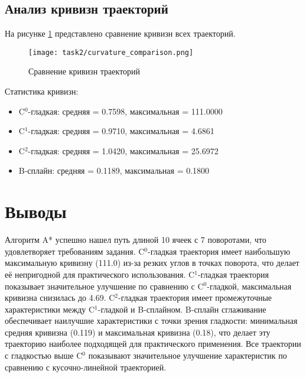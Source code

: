 \subsection{Анализ кривизн траекторий}

На рисунке \ref{fig:curvature_comparison} представлено сравнение кривизн всех траекторий.

\begin{figure}[H]
\centering
\texttt{[image: task2/curvature\_comparison.png]}
\caption{Сравнение кривизн траекторий}
\label{fig:curvature_comparison}
\end{figure}

Статистика кривизн:
\begin{itemize}
\item C$^0$-гладкая: средняя = 0.7598, максимальная = 111.0000
\item C$^1$-гладкая: средняя = 0.9710, максимальная = 4.6861
\item C$^2$-гладкая: средняя = 1.0420, максимальная = 25.6972
\item B-сплайн: средняя = 0.1189, максимальная = 0.1800
\end{itemize}

\section{Выводы}

Алгоритм A* успешно нашел путь длиной 10 ячеек с 7 поворотами, что удовлетворяет требованиям задания. C$^0$-гладкая траектория имеет наибольшую максимальную кривизну (111.0) из-за резких углов в точках поворота, что делает её непригодной для практического использования. C$^1$-гладкая траектория показывает значительное улучшение по сравнению с C$^0$-гладкой, максимальная кривизна снизилась до 4.69. C$^2$-гладкая траектория имеет промежуточные характеристики между C$^1$-гладкой и B-сплайном. B-сплайн сглаживание обеспечивает наилучшие характеристики с точки зрения гладкости: минимальная средняя кривизна (0.119) и максимальная кривизна (0.18), что делает эту траекторию наиболее подходящей для практического применения. Все траектории с гладкостью выше C$^0$ показывают значительное улучшение характеристик по сравнению с кусочно-линейной траекторией.

